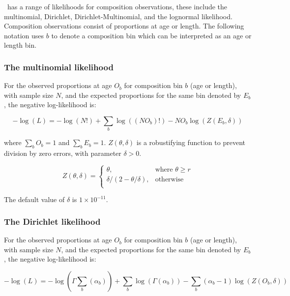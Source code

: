 \CNAME\ has a range of likelihoods for composition observations, these include the multinomial, Dirichlet, Dirichlet-Multinomial, and the lognormal likelihood. Composition observations consist of proportions at age or length. The following notation uses \(b\) to denote a composition bin which can be interpreted as an age or length bin.

\subsubsection{The multinomial likelihood }

For the observed proportions at age $O_b$ for composition bin $b$ (age or length), with sample size $N$, and the expected proportions for the same bin denoted by $E_b$, the negative log-likelihood is:

\begin{equation}
	-\log \left(L \right) =  -\log \left(N! \right) + \sum\limits_b\log \left( \left(NO_b \right)! \right) - NO_b \log \left(Z \left(E_b,\delta \right) \right)
\end{equation}

where $\sum\limits_b O_b = 1$ and $\sum\limits_b E_b = 1$. $Z \left(\theta,\delta \right)$ is a robustifying function to prevent division by zero errors, with parameter $\delta>0$.

\begin{equation}
	Z \left(\theta,\delta \right) = \begin{cases}
	\theta, & \text{where $\theta \ge r$} \\
	\delta/\left( 2-\theta/\delta \right), & \text{otherwise} \\
	\end{cases}
\end{equation}

The default value of $\delta$ is $1 \times 10^{-11}$.

\subsubsection{The Dirichlet likelihood }

For the observed proportions at age $O_b$ for composition bin $b$ (age or length), with sample size $N$, and the expected proportions for the same bin denoted by $E_b$, the negative log-likelihood is:

\begin{equation}
	-\log \left(L \right) = -\log(\Gamma \sum\limits_b (\alpha_b)) + \sum\limits_b \log(\Gamma (\alpha_b)) - \sum\limits_b (\alpha_b-1) \log(Z(O_b,\delta))
\end{equation}

